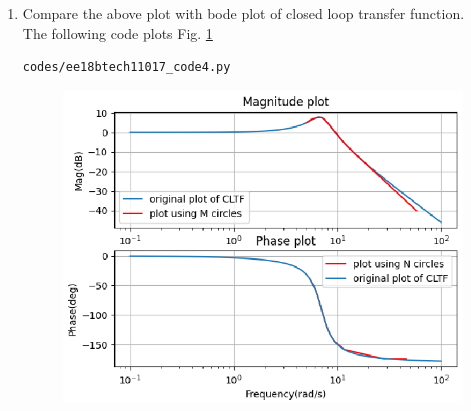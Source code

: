 \begin{enumerate}[label=\thesection.\arabic*.,ref=\thesection.\theenumi]
\item
Compare the above plot with bode plot of closed loop transfer function.\\
\solution
The following code plots Fig. \ref{fig:ee18btech11017_fig3}
\begin{lstlisting}
codes/ee18btech11017_code4.py
\end{lstlisting}

\begin{figure}[!h]
  \includegraphics[width=\columnwidth]{./figs/ee18btech11017_fig3.eps}
 \caption{}
  \label{fig:ee18btech11017_fig3}
\end{figure}














\end{enumerate}
